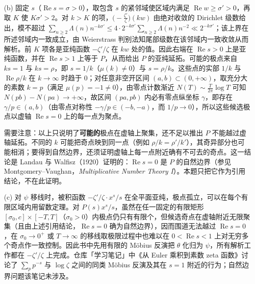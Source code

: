 \documentclass[11pt,a4paper]{article}
\renewcommand{\Re}{\operatorname{Re}}
\begin{document}
(b) 固定 $s$（$\Re s=\sigma>0$），取包含 $s$ 的紧邻域使区域内满足 $\Re w\ge\sigma'>0$，再取 $K$ 使 $K\sigma'>2$。对 $k>K$ 的项，$\bigl(-\frac{\zeta'}{\zeta}\bigr)(kw)$ 由绝对收敛的 Dirichlet 级数给出，模不超过 $\sum_{n\ge2}\Lambda(n)n^{-k\sigma'}\le4\cdot2^{-k\sigma'}\sum_{n\ge2}\Lambda(n)n^{-2}\ll2^{-k\sigma'}$；该上界在所述邻域内一致成立，由 Weierstrass 判别法知尾部级数在该邻域内一致收敛从而解析。前 $K$ 项各是亚纯函数 $-\zeta'/\zeta$ 在 $kw$ 处的值。因此右端在 $\Re s>0$ 上是亚纯函数，并在 $\Re s>1$ 上等于 $P$，从而给出 $P$ 的亚纯延拓。可能的极点来自 $ks=1$ 与 $ks=\rho$，即 $s=1/k$（$\mu(k)\ne0$）与 $s=\rho/k$。这些点的实部 $1/k$ 与 $\Re\rho/k$ 在 $k\to\infty$ 时趋于 $0$；对任意非空开区间 $(a,b)\subset(0,+\infty)$，取充分大的素数 $k=p$（满足 $\mu(p)=-1\ne0$），由零点计数渐近 $N(T)\sim\frac{T}{2\pi}\log T$ 可知 $N(pb)-N(pa)\to+\infty$，故区间 $(pa,pb)$ 内必有零点纵坐标 $\gamma$，即存在 $\gamma/p\in(a,b)$（由零点对称性 $-\gamma/p\in(-b,-a)$，而 $1/p\to0$），所以这些候选极点以虚轴 $\Re s=0$ 上的每一点为聚点。

需要注意：以上只说明了\textbf{可能的}极点在虚轴上聚集，还不足以推出 $P$ 不能越过虚轴延拓。不同的 $k$ 可能把奇点映到同一点（例如 $\rho/k=\rho'/k'$），其奇异部分也可能相消；要得到自然边界，还须证明虚轴上每一点附近确有不可去的奇点。这一结论是 Landau 与 Walfisz（1920）证明的：$\Re s=0$ 是 $P$ 的自然边界（参见 Montgomery--Vaughan，\emph{Multiplicative Number Theory I}）。本题只把它作为引用结论，不在此证明。

(c) 对 $\psi$ 移线时，被积函数 $-\zeta'/\zeta\cdot x^s/s$ 在全平面亚纯，极点孤立，可以在每个有限区域内用留数定理。对 $P(s)x^s/s$，虽然在任一固定的有限矩形 $[\sigma_0,c]\times[-T,T]$（$\sigma_0>0$）内极点仍只有有限个，但候选奇点在虚轴附近无限聚集（且由上述引用结论，$\Re s=0$ 确为自然边界），因而围道无法越过 $\Re s=0$，在 $\sigma_0\to0^+$ 或 $T\to\infty$ 的移线取极限过程中也难以在 $0<\Re s<1$ 上对无穷多个奇点作一致控制。因此书中先用有限的 Möbius 反演把 $\theta$ 化归为 $\psi$，所有解析工作都在 $-\zeta'/\zeta$ 上完成。仓库「学习笔记」中《从 Euler 乘积到素数 zeta 函数》讨论了 $\sum_p p^{-s}$ 与 $\log\zeta$ 之间的同类 Möbius 反演及其在 $s=1$ 附近的行为；自然边界问题该笔记未涉及。
\end{document}
